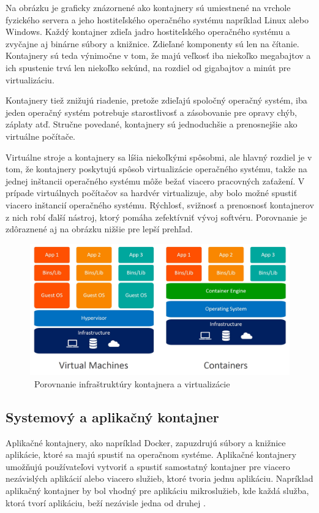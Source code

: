 Na obrázku je graficky znázornené ako kontajnery sú umiestnené na vrchole fyzického servera a jeho hostiteľského operačného systému napríklad Linux alebo Windows. Každý kontajner zdieľa jadro hostiteľského operačného systému a zvyčajne aj binárne súbory a knižnice. Zdieľané komponenty sú len na čítanie. Kontajnery sú teda výnimočne v tom, že majú veľkosť iba niekoľko megabajtov a ich spustenie trvá len niekoľko sekúnd, na rozdiel od gigabajtov a minút pre virtualizáciu.

Kontajnery tiež znižujú riadenie, pretože zdieľajú spoločný operačný systém, iba jeden operačný systém potrebuje starostlivosť a zásobovanie pre opravy chýb, záplaty atď. Stručne povedané, kontajnery sú jednoduchšie a prenosnejšie ako virtuálne počítače.

Virtuálne stroje a kontajnery sa líšia niekoľkými spôsobmi, ale hlavný rozdiel je v tom, že kontajnery poskytujú spôsob virtualizácie operačného systému, takže na jednej inštancii operačného systému môže bežať viacero pracovných zaťažení. V prípade virtuálnych počítačov sa hardvér virtualizuje, aby bolo možné spustiť viacero inštancií operačného systému. Rýchlosť, svižnosť a prenosnosť kontajnerov z nich robí ďalší nástroj, ktorý pomáha zefektívniť vývoj softvéru. Porovnanie je zdôraznené aj na obrázku nižšie pre lepší prehľad.

\begin{figure}[!ht]
    \includegraphics[width=.9\textwidth]{figures/containervsvirtual}
    \caption{\ Porovnanie infraštruktúry kontajnera a virtualizácie \cite{containervsvirtual} \label{o:latex_friendly_zone}}
\end{figure}

\subsection{Systemový a aplikačný kontajner}

Aplikačné kontajnery, ako napríklad Docker, zapuzdrujú súbory a knižnice aplikácie, ktoré sa majú spustiť na operačnom systéme. Aplikačné kontajnery umožňujú používateľovi vytvoriť a spustiť samostatný kontajner pre viacero nezávislých aplikácií alebo viacero služieb, ktoré tvoria jednu aplikáciu. Napríklad aplikačný kontajner by bol vhodný pre aplikáciu mikroslužieb, kde každá služba, ktorá tvorí aplikáciu, beží nezávisle jedna od druhej \cite{systemvsapli1}.

